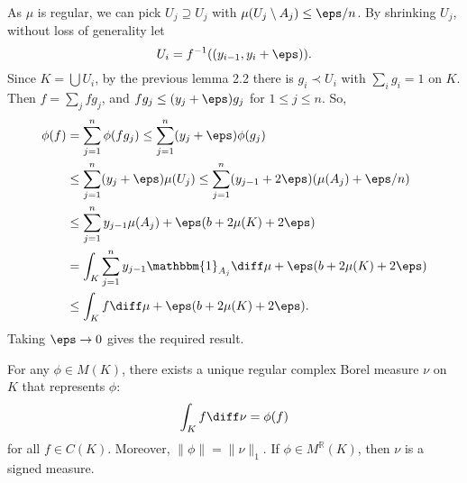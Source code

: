 \documentclass[12pt]{article}
\begin{document}
\begin{proofbox}
	As $\mu$ is regular, we can pick $U_j \supseteq U_j$ with $\mu(U_j \setminus A_j) \leq \eps/n$. By shrinking $U_j$, without loss of generality let
	\[
	U_i = f^{-1}((y_{i-1}, y_i + \eps)).
	\]
	Since $K = \bigcup U_i$, by the previous lemma 2.2 there is $g_i \prec U_i$ with $\sum_i g_i = 1$ on $K$. Then $f = \sum_j f g_j$, and $f g_j \leq (y_j + \eps) g_j$ for $1 \leq j \leq n$. So,
	\begin{align*}
		\phi(f) &= \sum_{j = 1}^n \phi(f g_j) \leq \sum_{j = 1}^n (y_j + \eps) \phi(g_j) \\
			&\leq \sum_{j = 1}^n (y_j + \eps) \mu(U_j) \leq \sum_{j= 1}^n (y_{j-1} + 2 \eps)(\mu(A_j)+  \eps/n) \\
			&\leq \sum_{j = 1}^n y_{j-1} \mu(A_j) + \eps (b + 2 \mu(K) + 2 \eps) \\
			& = \int_K \sum_{j = 1}^n y_{j-1} \mathbbm{1}_{A_j} \diff \mu + \eps (b + 2 \mu(K) + 2 \eps) \\
			&\leq \int_K f \diff \mu + \eps(b + 2 \mu(K) + 2 \eps).
	\end{align*}
	Taking $\eps \to 0$ gives the required result.
\end{proofbox}

\begin{corollary}
	For any $\phi \in M(K)$, there exists a unique regular complex Borel measure $\nu$ on $K$ that represents $\phi$:
	\[
	\int_K f \diff \nu = \phi(f)
	\]
	for all $f \in C(K)$. Moreover, $\|\phi\| = \|\nu\|_1$. If $\phi \in M^{\mathbb{R}}(K)$, then $\nu$ is a signed measure.
\end{corollary}
\end{document}
